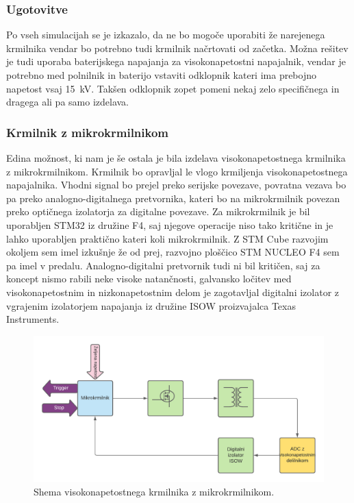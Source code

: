 \documentclass[a4paper,twoside,openright,12pt,Slovene]{book}
\begin{document}
    \subsubsection{Ugotovitve} \label{Ugotovitve glede komercialnih krmilnkov}
Po vseh simulacijah se je izkazalo, da ne bo mogoče uporabiti že narejenega krmilnika vendar bo potrebno tudi krmilnik načrtovati od začetka. Možna rešitev je tudi uporaba baterijskega napajanja za visokonapetostni napajalnik, vendar je potrebno med polnilnik in baterijo vstaviti odklopnik kateri ima prebojno napetost vsaj \SI{15}{\kilo\volt}. Takšen odklopnik zopet pomeni nekaj zelo specifičnega in dragega ali pa samo izdelava. 

	\subsubsection{Krmilnik z mikrokrmilnikom} \label{KrmilnikzUc}
Edina možnost, ki nam je še ostala je bila izdelava visokonapetostnega krmilnika z mikrokrmilnikom. Krmilnik bo opravljal le vlogo krmiljenja visokonapetostnega napajalnika. Vhodni signal bo prejel preko serijske povezave, povratna vezava bo pa preko analogno-digitalnega pretvornika, kateri bo na mikrokrmilnik povezan preko optičnega izolatorja za digitalne povezave. Za mikrokrmilnik je bil uporabljen STM32 iz družine F4, saj njegove operacije niso tako kritične in je lahko uporabljen praktično kateri koli mikrokrmilnik. Z STM Cube razvojim okoljem sem imel izkušnje že od prej, razvojno ploščico STM NUCLEO F4 sem pa imel v predalu. Analogno-digitalni pretvornik tudi ni bil kritičen, saj za koncept nismo rabili neke visoke natančnosti, galvansko ločitev med visokonapetostnim in nizkonapetostnim delom je zagotavljal digitalni izolator z vgrajenim izolatorjem napajanja iz družine ISOW proizvajalca Texas Instruments. 

	\begin{figure}[H]
    \centering
    \includegraphics[width=1\columnwidth]{Sheme/KrmilnikzuCElShema.pdf}
    \caption{\label{KrmilnikzuCElShema} Shema visokonapetostnega krmilnika z mikrokrmilnikom.}
	\end{figure}
\end{document}
